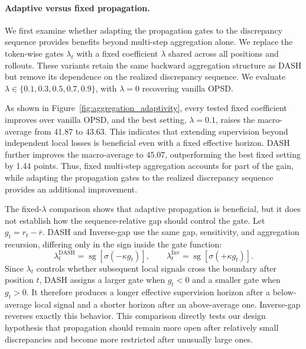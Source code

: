 \documentclass[letterpaper]{article} %
\begin{document}
\paragraph{Adaptive versus fixed propagation.}
We first examine whether adapting the propagation gates to the discrepancy sequence provides benefits beyond multi-step aggregation alone. We replace the token-wise gates $\lambda_t$ with a fixed coefficient $\lambda$ shared across all positions and rollouts. These variants retain the same backward aggregation structure as DASH but remove its dependence on the realized discrepancy sequence. We evaluate $\lambda\in\{0.1,0.3,0.5,0.7,0.9\}$, with $\lambda=0$ recovering vanilla OPSD.

As shown in Figure~\ref{fig:aggregation_adaptivity}, every tested fixed coefficient improves over vanilla OPSD, and the best setting, $\lambda=0.1$, raises the macro-average from 41.87 to 43.63. This indicates that extending supervision beyond independent local losses is beneficial even with a fixed effective horizon. DASH further improves the macro-average to 45.07, outperforming the best fixed setting by 1.44 points. Thus, fixed multi-step aggregation accounts for part of the
gain, while adapting the propagation gates to the realized discrepancy
sequence provides an additional improvement.

The fixed-$\lambda$ comparison shows that adaptive propagation is
beneficial, but it does not establish how the sequence-relative gap
should control the gate. Let $g_t=r_t-\bar r$. DASH and Inverse-gap use
the same gap, sensitivity, and aggregation recursion, differing only in
the sign inside the gate function:
\begin{equation}
    \lambda_t^{\mathrm{DASH}}
    =
    \operatorname{sg}\!\left[\sigma(-\kappa g_t)\right],
    \qquad
    \lambda_t^{\mathrm{Inv}}
    =
    \operatorname{sg}\!\left[\sigma(+\kappa g_t)\right].
    \label{eq:inverse_gap_control}
\end{equation}
Since $\lambda_t$ controls whether subsequent local signals cross the
boundary after position $t$, DASH assigns a larger gate when
$g_t<0$ and a smaller gate when $g_t>0$. It therefore produces a longer
effective supervision horizon after a below-average local signal and a
shorter horizon after an above-average one. Inverse-gap reverses exactly
this behavior. This comparison directly tests our design hypothesis
that propagation should remain more open after relatively small
discrepancies and become more restricted after unusually large ones.
\end{document}
